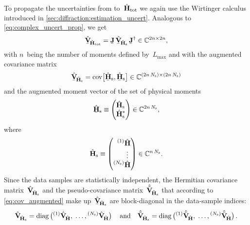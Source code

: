 To propagate the uncertainties from
to~$\hat{\bm{\mathrm{H}}}_\text{tot}$ we again use the Wirtinger calculus
introduced in \cref{sec:diffraction:estimation_uncert}.  Analogous to
\cref{eq:complex_uncert_prop}, we get
\begin{equation}
  \label{eq:photoprod_data_sample_complex_uncert_prop}
  \underaccent{\bar}{\hat{\covMatSym}}_{\!\hat{\vect{H}}_\text{tot}}
  = \underaccent{\bar}{\mat{J}}\, \underaccent{\bar}{\hat{\covMatSym}}_{\!\hat{\vect{H}}_\text{s}}\, \underaccent{\bar}{\mat{J}}^\dagger
  \in \mathbb{C}^{2n \times 2n},
\end{equation}
with $n$~being the number of moments defined by~$L_\text{max}$ and
with the augmented covariance matrix
\begin{equation}
  \underaccent{\bar}{\hat{\covMatSym}}_{\!\hat{\vect{H}}_\text{s}}
  = \cov[1]{\underaccent{\bar}{\hat{\vect{H}}}_\text{s}, \underaccent{\bar}{\hat{\vect{H}}}_\text{s}}
  \in \mathbb{C}^{(2n\, N_\text{s}) \times (2n\, N_\text{s})}
\end{equation}
and the augmented moment vector of the set
 of physical
moments
\begin{equation}
  \underaccent{\bar}{\hat{\vect{H}}}_\text{s}
  \equiv \begin{pmatrix*}[l]
    \hat{\vect{H}}_\text{s} \\
    \hat{\vect{H}}_\text{s}^*
  \end{pmatrix*}
  \in \mathbb{C}^{2n\, N_\text{s}},
\end{equation}
where
\begin{equation}
  \hat{\vect{H}}_\text{s}
  \equiv \begin{pmatrix*}[r]
    \prescript{(1)}{}{\vphantom{\vect{H}}}\hat{\vect{H}} \\
    \vdots~ \\
    \prescript{(N_\text{s})}{}{\vphantom{\vect{H}}}\hat{\vect{H}}
  \end{pmatrix*}
  \in \mathbb{C}^{n\, N_\text{s}}.
\end{equation}
Since the data samples are statistically independent, the Hermitian
covariance matrix~$\hat{\bm{\mathrm{V}}}_{\!\hat{\bm{\mathrm{H}}}_\text{s}}$ and
the pseudo-covariance
matrix~$\hat{\tilde{\bm{\mathrm{V}}}}_{\!\hat{\bm{\mathrm{H}}}_\text{s}}$ that
according to \cref{eq:cov_augmented} make
up~$\underaccent{\bar}{\hat{\covMatSym}}_{\!\hat{\vect{H}}_\text{s}}$
are block-diagonal in the data-sample indices:
\begin{equation}
  \label{eq:photoprod_data_sample_cov_mats}
  \hat{\covMatSym}_{\!\hat{\vect{H}}_\text{s}}
  = \diag\rBrk[1]{\prescript{(1)}{}{\vphantom{\vect{H}}}\hat{\covMatSym}_{\!\hat{\vect{H}}},\;
  \ldots,
  \prescript{(N_\text{s})}{}{\vphantom{\vect{H}}}\hat{\covMatSym}_{\!\hat{\vect{H}}}}
  \quad\text{and}\quad
  \hat{\tilde{\covMatSym}}_{\!\hat{\vect{H}}_\text{s}}
  = \diag\rBrk[1]{\prescript{(1)}{}{\vphantom{\vect{H}}}\hat{\tilde{\covMatSym}}_{\!\hat{\vect{H}}},\;
  \ldots,
  \prescript{(N_\text{s})}{}{\vphantom{\vect{H}}}\hat{\tilde{\covMatSym}}_{\!\hat{\vect{H}}}}.
\end{equation}
